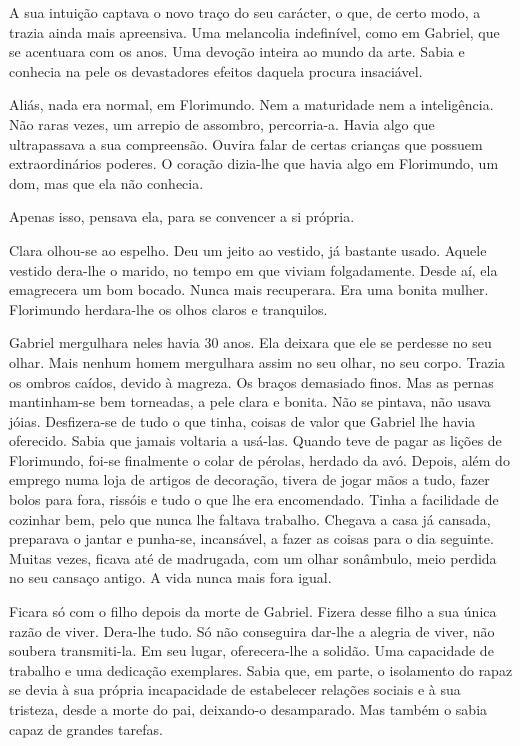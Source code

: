A sua intuição captava o novo traço do seu carácter, o que, de certo
modo, a trazia ainda mais apreensiva. Uma melancolia indefinível, como
em Gabriel, que se acentuara com os anos. Uma devoção inteira ao mundo
da arte. Sabia e conhecia na pele os devastadores efeitos daquela
procura insaciável.

Aliás, nada era normal, em Florimundo. Nem a maturidade nem a
inteligência. Não raras vezes, um arrepio de assombro, percorria-a.
Havia algo que ultrapassava a sua compreensão. Ouvira falar de certas
crianças que possuem extraordinários poderes. O coração dizia-lhe que
havia algo em Florimundo, um dom, mas que ela não conhecia.

Apenas isso, pensava ela, para se convencer a si própria.

Clara olhou-se ao espelho. Deu um jeito ao vestido, já bastante usado.
Aquele vestido dera-lhe o marido, no tempo em que viviam folgadamente.
Desde aí, ela emagrecera um bom bocado. Nunca mais recuperara. Era uma
bonita mulher. Florimundo herdara-lhe os olhos claros e tranquilos.

Gabriel mergulhara neles havia 30 anos. Ela deixara que ele se perdesse
no seu olhar. Mais nenhum homem mergulhara assim no seu olhar, no seu
corpo. Trazia os ombros caídos, devido à magreza. Os braços demasiado
finos. Mas as pernas mantinham-se bem torneadas, a pele clara e bonita.
Não se pintava, não usava jóias. Desfizera-se de tudo o que tinha,
coisas de valor que Gabriel lhe havia oferecido. Sabia que jamais
voltaria a usá-las. Quando teve de pagar as lições de Florimundo, foi-se
finalmente o colar de pérolas, herdado da avó. Depois, além do emprego
numa loja de artigos de decoração, tivera de jogar mãos a tudo, fazer
bolos para fora, rissóis e tudo o que lhe era encomendado. Tinha a
facilidade de cozinhar bem, pelo que nunca lhe faltava trabalho. Chegava
a casa já cansada, preparava o jantar e punha-se, incansável, a fazer as
coisas para o dia seguinte. Muitas vezes, ficava até de madrugada, com
um olhar sonâmbulo, meio perdida no seu cansaço antigo. A vida nunca
mais fora igual.

Ficara só com o filho depois da morte de Gabriel. Fizera desse filho a
sua única razão de viver. Dera-lhe tudo. Só não conseguira dar-lhe a
alegria de viver, não soubera transmiti-la. Em seu lugar, oferecera-lhe
a solidão. Uma capacidade de trabalho e uma dedicação exemplares. Sabia
que, em parte, o isolamento do rapaz se devia à sua própria incapacidade
de estabelecer relações sociais e à sua tristeza, desde a morte do pai,
deixando-o desamparado. Mas também o sabia capaz de grandes tarefas.

